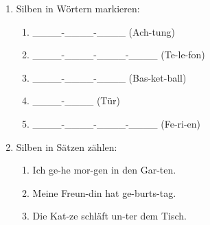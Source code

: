 \documentclass[a4paper]{article}
\begin{document}
\begin{enumerate}[label=\arabic*.]
    \item Silben in Wörtern markieren:
    
    \begin{enumerate}[label=\alph*)]
        \item \_\_\_\_-\_\_\_\_-\_\_\_\_ (Ach-tung)
        \item \_\_\_\_-\_\_\_\_-\_\_\_\_-\_\_\_\_ (Te-le-fon)
        \item \_\_\_\_-\_\_\_\_-\_\_\_\_ (Bas-ket-ball)
        \item \_\_\_\_-\_\_\_\_ (Tür)
        \item \_\_\_\_-\_\_\_\_-\_\_\_\_-\_\_\_\_ (Fe-ri-en)
    \end{enumerate}
    
    \vspace{1cm}
    
    \item Silben in Sätzen zählen:
    
    \begin{enumerate}[label=\alph*)]
        \item Ich ge-he mor-gen in den Gar-ten.
        \item Meine Freun-din hat ge-burts-tag.
        \item Die Kat-ze schläft un-ter dem Tisch.
    \end{enumerate}
    
\end{enumerate}
\end{document}
